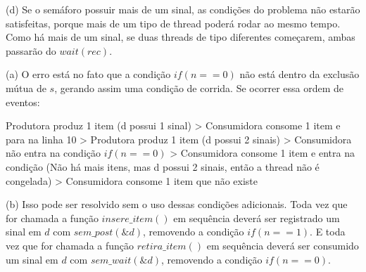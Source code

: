 \documentclass{homework}
\begin{document}
(d) Se o semáforo possuir mais de um sinal, as condições do problema não estarão satisfeitas, porque mais de um tipo de thread poderá rodar ao mesmo tempo. Como há mais de um sinal, se duas threads de tipo diferentes começarem, ambas passarão do $wait(rec)$.

\exercise*
(a) O erro está no fato que a condição $if(n==0)$ não está dentro da exclusão mútua de $s$, gerando assim uma condição de corrida. Se ocorrer essa ordem de eventos:

Produtora produz 1 item (d possui 1 sinal) > Consumidora consome 1 item e para na linha 10 > Produtora produz 1 item (d possui 2 sinais) > Consumidora não entra na condição $if(n==0)$ > Consumidora consome 1 item e entra na condição (Não há mais itens, mas d possui 2 sinais, então a thread não é congelada) > Consumidora consome 1 item que não existe

(b) Isso pode ser resolvido sem o uso dessas condições adicionais. Toda vez que for chamada a função $insere\_item()$ em sequência deverá ser registrado um sinal em $d$ com $sem\_post(\&d)$, removendo a condição $if(n==1)$. E toda vez que for chamada a função $retira\_item()$ em sequência deverá ser consumido um sinal em $d$ com $sem\_wait(\&d)$, removendo a condição $if(n==0)$. 
\end{document}
